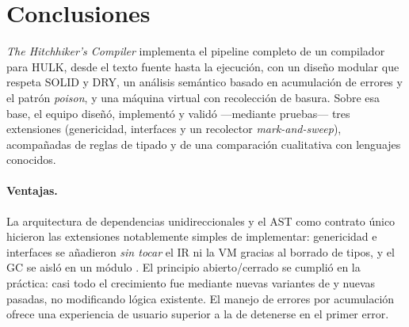 \documentclass[14pts,runningheads,a4paper]{llncs}
\newcommand{\code}[1]{\texttt{\detokenize{#1}}}
\begin{document}
\newpage
\section{Conclusiones}\label{sec:conclusiones}

\emph{The Hitchhiker's Compiler} implementa el pipeline completo de un compilador
para HULK, desde el texto fuente hasta la ejecuci\'on, con un dise\~no modular que
respeta SOLID y DRY, un an\'alisis sem\'antico basado en acumulaci\'on de
errores y el patr\'on \emph{poison}, y una m\'aquina virtual con recolecci\'on de basura.
Sobre esa base, el equipo dise\~n\'o, implement\'o y valid\'o ---mediante pruebas--- tres
extensiones (genericidad, interfaces y un recolector \emph{mark-and-sweep}),
acompa\~nadas de reglas de tipado y de una comparaci\'on cualitativa con lenguajes
conocidos.

\paragraph{Ventajas.}
La arquitectura de dependencias unidireccionales y el AST como contrato \'unico
hicieron las extensiones notablemente simples de implementar: genericidad e interfaces se a\~nadieron
\emph{sin tocar} el IR ni la VM gracias al borrado de tipos, y el GC se aisl\'o en un
m\'odulo \code{heap.rs}. El principio abierto/cerrado se cumpli\'o en la pr\'actica: casi
todo el crecimiento fue mediante nuevas variantes de \code{enum} y nuevas pasadas,
no modificando l\'ogica existente. El manejo de errores por acumulaci\'on ofrece una
experiencia de usuario superior a la de detenerse en el primer error.
\end{document}
